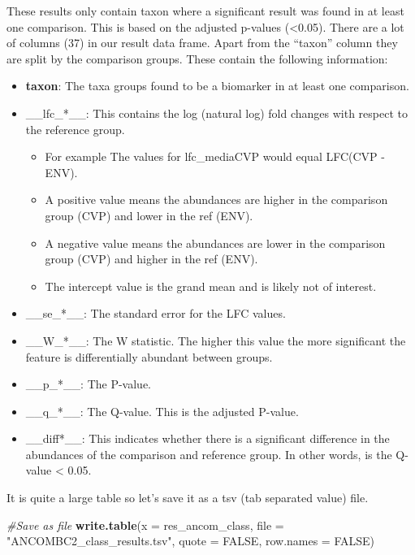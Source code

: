 \documentclass[
]{book}
\newenvironment{Shaded}{\begin{snugshade}}{\end{snugshade}}
\newcommand{\AttributeTok}[1]{\textcolor[rgb]{0.13,0.29,0.53}{#1}}
\newcommand{\CommentTok}[1]{\textcolor[rgb]{0.56,0.35,0.01}{\textit{#1}}}
\newcommand{\ConstantTok}[1]{\textcolor[rgb]{0.56,0.35,0.01}{#1}}
\newcommand{\FunctionTok}[1]{\textcolor[rgb]{0.13,0.29,0.53}{\textbf{#1}}}
\newcommand{\NormalTok}[1]{#1}
\newcommand{\StringTok}[1]{\textcolor[rgb]{0.31,0.60,0.02}{#1}}
\providecommand{\tightlist}{%
  \setlength{\itemsep}{0pt}\setlength{\parskip}{0pt}}
\begin{document}
These results only contain taxon where a significant result was found in at least one comparison.
This is based on the adjusted p-values (\textless0.05).
There are a lot of columns (37) in our result data frame.
Apart from the ``taxon'' column they are split by the comparison groups.
These contain the following information:

\begin{itemize}
\tightlist
\item
  \textbf{taxon}: The taxa groups found to be a biomarker in at least one comparison.
\item
  \_\_lfc\_*\_\_: This contains the log (natural log) fold changes with respect to the reference group.

  \begin{itemize}
  \tightlist
  \item
    For example The values for lfc\_mediaCVP would equal LFC(CVP - ENV).
  \item
    A positive value means the abundances are higher in the comparison group (CVP) and lower in the ref (ENV).
  \item
    A negative value means the abundances are lower in the comparison group (CVP) and higher in the ref (ENV).
  \item
    The intercept value is the grand mean and is likely not of interest.
  \end{itemize}
\item
  \_\_se\_*\_\_: The standard error for the LFC values.
\item
  \_\_W\_*\_\_: The W statistic. The higher this value the more significant the feature is differentially abundant between groups.
\item
  \_\_p\_*\_\_: The P-value.
\item
  \_\_q\_*\_\_: The Q-value. This is the adjusted P-value.
\item
  \_\_diff*\_\_: This indicates whether there is a significant difference in the abundances of the comparison and reference group. In other words, is the Q-value \textless{} 0.05.
\end{itemize}

It is quite a large table so let's save it as a tsv (tab separated value) file.

\begin{Shaded}
\begin{Highlighting}[]
\CommentTok{\#Save as file}
\FunctionTok{write.table}\NormalTok{(}\AttributeTok{x =}\NormalTok{ res\_ancom\_class, }\AttributeTok{file =} \StringTok{"ANCOMBC2\_class\_results.tsv"}\NormalTok{,}
            \AttributeTok{quote =} \ConstantTok{FALSE}\NormalTok{, }\AttributeTok{row.names =} \ConstantTok{FALSE}\NormalTok{)}
\end{Highlighting}
\end{Shaded}
\end{document}
